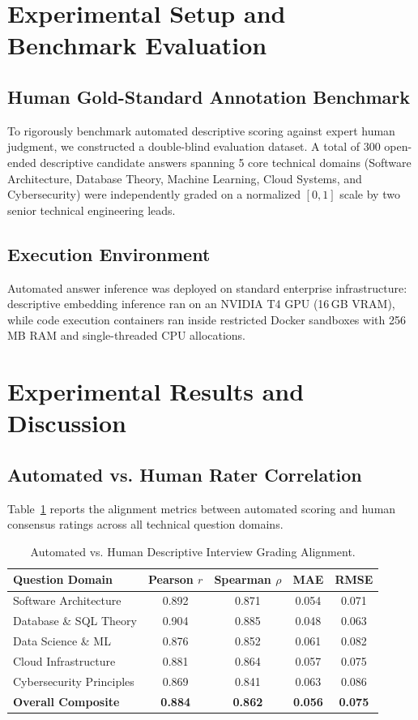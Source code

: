 \documentclass[conference]{IEEEtran}
\begin{document}
\section{Experimental Setup and Benchmark Evaluation}

\subsection{Human Gold-Standard Annotation Benchmark}
To rigorously benchmark automated descriptive scoring against expert human judgment, we constructed a double-blind evaluation dataset. A total of 300 open-ended descriptive candidate answers spanning 5 core technical domains (Software Architecture, Database Theory, Machine Learning, Cloud Systems, and Cybersecurity) were independently graded on a normalized $[0, 1]$ scale by two senior technical engineering leads.

\subsection{Execution Environment}
Automated answer inference was deployed on standard enterprise infrastructure: descriptive embedding inference ran on an NVIDIA T4 GPU (16\,GB VRAM), while code execution containers ran inside restricted Docker sandboxes with 256\,MB RAM and single-threaded CPU allocations.

\section{Experimental Results and Discussion}

\subsection{Automated vs. Human Rater Correlation}
Table~\ref{tab:c2_alignment} reports the alignment metrics between automated scoring and human consensus ratings across all technical question domains.

\begin{table}[htbp]
\caption{Automated vs. Human Descriptive Interview Grading Alignment.}
\begin{center}
\begin{tabular}{lcccc}
\toprule
\textbf{Question Domain} & \textbf{Pearson $r$} & \textbf{Spearman $\rho$} & \textbf{MAE} & \textbf{RMSE} \\
\midrule
Software Architecture    & 0.892 & 0.871 & 0.054 & 0.071 \\
Database \& SQL Theory   & 0.904 & 0.885 & 0.048 & 0.063 \\
Data Science \& ML       & 0.876 & 0.852 & 0.061 & 0.082 \\
Cloud Infrastructure     & 0.881 & 0.864 & 0.057 & 0.075 \\
Cybersecurity Principles & 0.869 & 0.841 & 0.063 & 0.086 \\
\midrule
\textbf{Overall Composite}& \textbf{0.884} & \textbf{0.862} & \textbf{0.056} & \textbf{0.075} \\
\bottomrule
\end{tabular}
\label{tab:c2_alignment}
\end{center}
\end{table}
\end{document}

